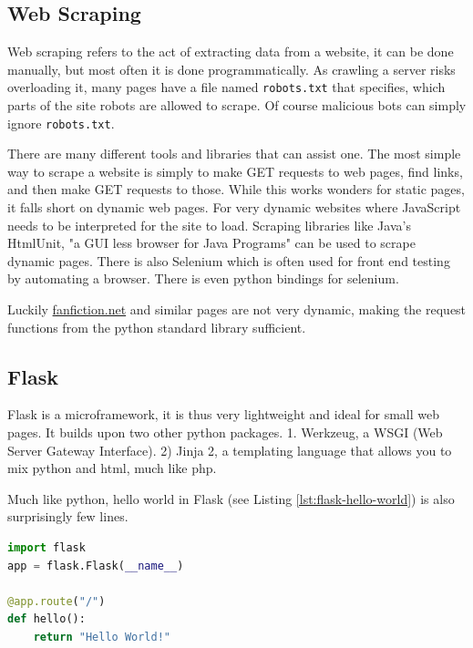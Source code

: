 \documentclass[]{report}   %
\begin{document}
\subsection{Web Scraping}
Web scraping refers to the act of extracting data from a website, it can be
done manually, but most often it is done programmatically. As crawling a server
risks overloading it, many pages have a file named
\texttt{robots.txt}\cite{robots} that specifies, which parts of the site robots
are allowed to scrape. Of course malicious bots can simply ignore \texttt{robots.txt}. 

There are many different tools and libraries that can assist one. The most
simple way to scrape a website is simply to make GET requests to web pages,
find links, and then make GET requests to those. While this works wonders for
static pages, it falls short on dynamic web pages. For very dynamic websites where
JavaScript needs to be interpreted for the site to load.
Scraping libraries like Java's HtmlUnit, "a GUI less browser for Java
Programs"\cite{java_htmlunit} can be used to scrape dynamic pages. There is also
Selenium\cite{selenium} which is often used for front end testing by automating
a browser. There is even python bindings for selenium\cite{py_selenium}.

Luckily \url{fanfiction.net} and similar pages are not very dynamic, making
the request functions from the python standard library sufficient.

\subsection{Flask}
Flask\cite{flask} is a microframework, it is thus very lightweight and ideal for small
web pages. It builds upon two other python packages. 1. Werkzeug, a WSGI (Web
Server Gateway Interface). 2) Jinja 2, a templating language that allows you to
mix python and html, much like php.

Much like python, hello world in Flask (see Listing
\ref{lst:flask-hello-world}) is also surprisingly few lines. 

\begin{minipage}{\linewidth}
\begin{lstlisting}[language=python, label={lst:flask-hello-world}, 
                   caption={Flask Hello World}]
import flask
app = flask.Flask(__name__)

@app.route("/")
def hello():
    return "Hello World!"
\end{lstlisting}
\end{minipage}
\end{document}
